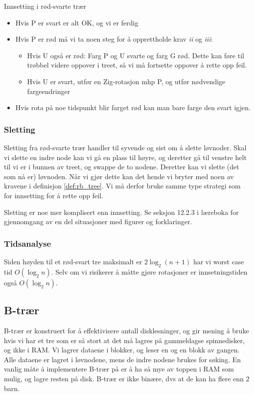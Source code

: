 \begin{theorem} Innsetting i rød-svarte trær
	
	\begin{itemize}
		\item Hvis P er svart er alt OK, og vi er ferdig
		\item Hvis P er rød må vi ta noen steg for å opprettholde krav \textit{ii} og \textit{iii}:
		\begin{itemize}
			\item Hvis U også er rød: Farg P og U svarte og farg G rød. Dette kan føre til trøbbel videre oppover i treet, så vi må fortsette oppover å rette opp feil.
			\item Hvis U er svart, utfør en Zig-rotasjon mhp P, og utfør nødvendige fargeendringer
		\end{itemize}
		\item Hvis rota på noe tidspunkt blir farget rød kan man bare farge den svart igjen.
	\end{itemize}
\end{theorem}


\subsubsection{Sletting}
Sletting fra rød-svarte trær handler til syvende og sist om å slette løvnoder. Skal vi slette en indre node kan vi gå en plass til høyre, og deretter gå til venstre helt til vi er i bunnen av treet, og swappe de to nodene. Deretter kan vi slette (det som nå er) løvnoden. Når vi gjør dette kan det hende vi bryter med noen av kravene i definisjon \ref{def:rb_tree}. Vi må derfor bruke samme type strategi som for innsetting for å rette opp feil. 

Sletting er noe mer komplisert enn innsetting. Se seksjon 12.2.3 i læreboka for gjennomgang av en del situasjoner med figurer og forklaringer. 


\subsubsection{Tidsanalyse}
Siden høyden til et rød-svart tre maksimalt er $ 2\log_2 (n+1) $ har vi worst case tid $ O(\log_2 n) $. Selv om vi risikerer å måtte gjøre rotasjoner er innsetningstiden også $ O(\log_2 n) $.



\subsection{B-trær} \label{b-tre}
B-trær er konstruert for å effektivisere antall disklesninger, og gir mening å bruke hvis vi har et tre som er så stort at det må lagres på gammeldagse spinnedisker, og ikke i RAM. Vi lagrer dataene i blokker, og leser en og en blokk av gangen. Alle dataene er lagret i løvnodene, mens de indre nodene brukes for søking. En vanlig måte å implementere B-trær på er å ha så mye av toppen i RAM som mulig, og lagre resten på disk. B-trær er ikke binære, dvs at de kan ha flere enn 2 barn. 

